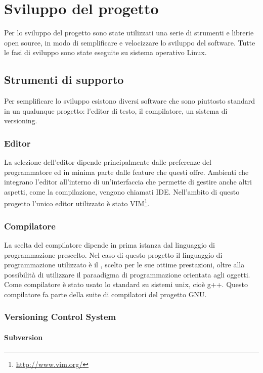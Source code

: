 \chapter{Sviluppo del progetto}
\label{sw_devel}

Per lo sviluppo del progetto sono state utilizzati una serie di strumenti e
librerie open source, in modo di semplificare e velocizzare lo sviluppo del
software. Tutte le fasi di sviluppo sono state eseguite su sistema operativo
Linux.
\section{Strumenti di supporto}
Per semplificare lo sviluppo esistono diversi software che sono piuttosto
standard in un qualunque progetto: l'editor di testo, il compilatore, un sistema
di versioning.

\subsection{Editor}
La selezione dell'editor dipende principalmente dalle preferenze del
programmatore ed in minima parte dalle feature che questi offre. Ambienti che
integrano l'editor all'interno di un'interfaccia che permette di gestire anche
altri aspetti, come la compilazione, vengono chiamati \ac{IDE}. Nell'ambito di
questo progetto l'unico editor utilizzato \`e stato
VIM\footnote{\url{http://www.vim.org/}}.

\subsection{Compilatore}
La scelta del compilatore dipende in prima istanza dal linguaggio di
programmazione prescelto. Nel caso di questo progetto il linguaggio di
programmazione utilizzato \`e il \CC, scelto per le sue ottime prestazioni,
oltre alla possibilit\`a di utilizzare il paraadigma di programmazione
orientata agli oggetti. Come compilatore \`e stato usato lo standard su sistemi
unix, cio\`e g++. Questo compilatore fa parte della suite di compilatori del
progetto GNU.

\subsection{Versioning Control System}
\subsubsection{Subversion}

